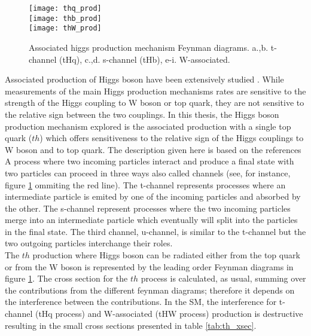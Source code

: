 \begin{figure}[h!]
\centering
\texttt{[image: thq\_prod]}\\
\texttt{[image: thb\_prod]}\\
\texttt{[image: thW\_prod]}\\
\caption[Associated Higgs production mechanism Feynman diagrams]{Associated higgs production mechanism Feynman diagrams. a.,b. t-channel (tHq), c.,d. s-channel (tHb), e-i. W-associated.}
\label{th_prod}
\end{figure}

\noindent \noindent Associated production of Higgs boson have been extensively studied \cite{maltoni1, biswas, farina,tait, maltoni2}. While measurements of the main Higgs production mechanisms rates are sensitive to the strength of the Higgs coupling to W boson or top quark, they are not sensitive to the relative sign between the two couplings. In this thesis, the Higgs boson production mechanism explored is the associated production with a single top quark ($th$) which offers sensitiveness to the relative sign of the Higgs couplings to W boson and to top quark. The description given here is based on the references \cite{farina,}\\

\noindent A process where two incoming particles interact and produce a final state with two particles can proceed in three ways also called channels (see, for instance, figure \ref{th_prod} ommiting the red line). The t-channel represents processes where an intermediate particle is emited by one of the incoming particles and absorbed by the other. The s-channel represent processes where the two incoming particles merge into an intermediate particle which eventually will split into the particles in the final state. The third channel, u-channel, is similar to the t-channel but the two outgoing particles interchange their roles.\\

\noindent The $th$ production where Higgs boson can be radiated either from the top quark or from the W boson is represented by the leading order Feynman diagrams in figure \ref{th_prod}. The cross section for the $th$ process is calculated, as usual, summing over the contributions from the different feynman diagrams; therefore it depends on the interference between the contributions. In the SM, the interference for t-channel (tHq process)  and W-associated (tHW process) production is destructive \cite{maltoni1} resulting in the small cross sections presented in table \ref{tab:th_xsec}. 

